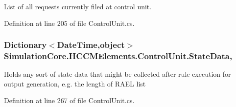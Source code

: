 List of all requests currently filed at control unit. 



Definition at line 205 of file Control\+Unit.\+cs.

\subsubsection[{\texorpdfstring{State\+Data}{StateData}}]{\setlength{\rightskip}{0pt plus 5cm}Dictionary$<$Date\+Time,object$>$ Simulation\+Core.\+H\+C\+C\+M\+Elements.\+Control\+Unit.\+State\+Data\hspace{0.3cm}{\ttfamily [get]}, {\ttfamily [set]}}\hypertarget{class_simulation_core_1_1_h_c_c_m_elements_1_1_control_unit_a51b80cf1eebe463edcb3a7e2f1355878}{}\label{class_simulation_core_1_1_h_c_c_m_elements_1_1_control_unit_a51b80cf1eebe463edcb3a7e2f1355878}


Holds any sort of state data that might be collected after rule execution for output generation, e.\+g. the length of R\+A\+EL list 



Definition at line 267 of file Control\+Unit.\+cs.

